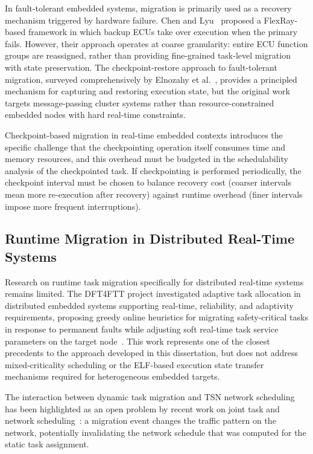 In fault-tolerant embedded systems, migration is primarily used as a recovery
mechanism triggered by hardware failure. Chen and Lyu~\cite{chen2012} proposed a
FlexRay-based framework in which backup ECUs take over execution when the primary
fails. However, their approach operates at coarse granularity: entire ECU function
groups are reassigned, rather than providing fine-grained task-level migration with
state preservation. The checkpoint-restore approach to fault-tolerant migration,
surveyed comprehensively by Elnozahy et al.~\cite{elnozahy2002}, provides a
principled mechanism for capturing and restoring execution state, but the original
work targets message-passing cluster systems rather than resource-constrained
embedded nodes with hard real-time constraints.

Checkpoint-based migration in real-time embedded contexts introduces the specific
challenge that the checkpointing operation itself consumes time and memory resources,
and this overhead must be budgeted in the schedulability analysis of the checkpointed
task. If checkpointing is performed periodically, the checkpoint interval must be
chosen to balance recovery cost (coarser intervals mean more re-execution after
recovery) against runtime overhead (finer intervals impose more frequent interruptions).

\subsection{Runtime Migration in Distributed Real-Time Systems}
\label{subsec:rw_migration_distributed}

Research on runtime task migration specifically for distributed real-time systems
remains limited. The DFT4FTT project investigated adaptive task allocation in
distributed embedded systems supporting real-time, reliability, and adaptivity
requirements, proposing greedy online heuristics for migrating safety-critical tasks
in response to permanent faults while adjusting soft real-time task service parameters
on the target node~\cite{dft4ftt}. This work represents one of the closest precedents
to the approach developed in this dissertation, but does not address mixed-criticality
scheduling or the ELF-based execution state transfer mechanisms required for
heterogeneous embedded targets.

The interaction between dynamic task migration and TSN network scheduling has been
highlighted as an open problem by recent work on joint task and network
scheduling~\cite{craciunas2016,xue2024}: a migration event changes the traffic
pattern on the network, potentially invalidating the network schedule that was
computed for the static task assignment.

